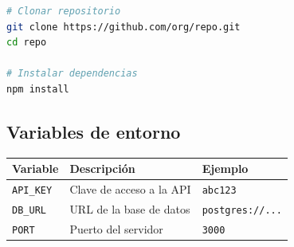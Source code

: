 \begin{lstlisting}[language=bash]
# Clonar repositorio
git clone https://github.com/org/repo.git
cd repo

# Instalar dependencias
npm install
\end{lstlisting}

\subsection{Variables de entorno}

\begin{center}
\begin{tabular}{lll}
    \toprule
    \textbf{Variable} & \textbf{Descripción} & \textbf{Ejemplo} \\
    \midrule
    \texttt{API\_KEY}   & Clave de acceso a la API & \texttt{abc123}
\\
    \texttt{DB\_URL}    & URL de la base de datos  &
\texttt{postgres://...} \\
    \texttt{PORT}       & Puerto del servidor      & \texttt{3000} \\
    \bottomrule
\end{tabular}
\end{center}